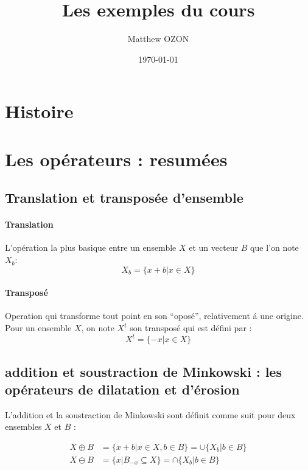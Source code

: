 \documentclass[10pt,a4paper]{article}
\title{Les exemples du cours}
\author{Matthew OZON} %
\date{\today}
\begin{document}
\maketitle

\section{Histoire}

\section{Les op\'{e}rateurs : resum\'{e}es}

\subsection{Translation et transpos\'{e}e d'ensemble}
\paragraph{Translation} L'op\'{e}ration la plus basique entre un ensemble $X$ et un vecteur $B$ que l'on note $X_b$: 
\begin{displaymath}
	X_b = \{x+b|x\in X\}
\end{displaymath}

\paragraph{Transpos\'{e}}
Operation qui transforme tout point en son ``opos\'{e}'', relativement \'{a} une origine. Pour un ensemble $X$, on note $X^t$ son transpos\'{e} qui est d\'{e}fini par : 
\begin{displaymath}
	X^t = \{-x | x\in X\}
\end{displaymath}

\subsection{addition et soustraction de Minkowski : les op\'{e}rateurs de dilatation et d'\'{e}rosion}

L'addition et la soustraction de Minkowski sont d\'{e}finit comme suit pour deux ensembles $X$ et $B$ :

\begin{align*}	
	X\oplus B &= \{x+b | x\in X, b\in B\} = \cup\{X_b | b\in B\} 	\\
	X\ominus B &= \{x | B_{-x}\subseteq X\} = \cap\{X_b | b\in B\}
\end{align*}
\end{document}

